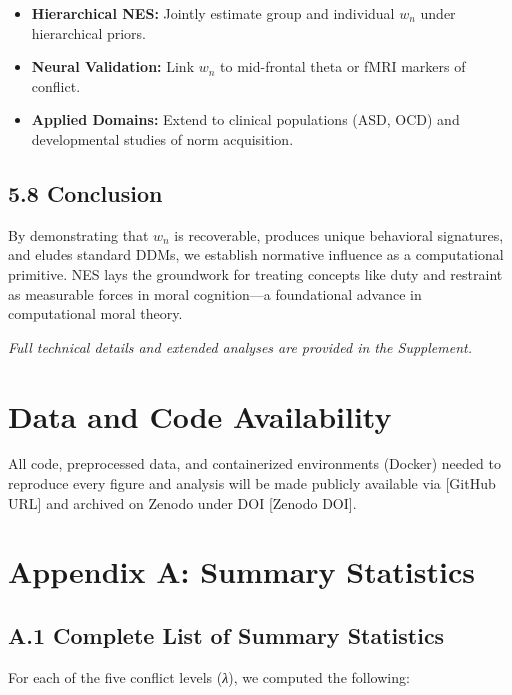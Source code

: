 \documentclass[
  11pt,
]{article}
\providecommand{\tightlist}{%
  \setlength{\itemsep}{0pt}\setlength{\parskip}{0pt}}
\begin{document}
\begin{itemize}
\tightlist
\item
  \textbf{Hierarchical NES:} Jointly estimate group and individual
  \(w_n\) under hierarchical priors.\\
\item
  \textbf{Neural Validation:} Link \(w_n\) to mid-frontal theta or fMRI
  markers of conflict.\\
\item
  \textbf{Applied Domains:} Extend to clinical populations (ASD, OCD)
  and developmental studies of norm acquisition.
\end{itemize}

\subsection{5.8 Conclusion}\label{conclusion}

By demonstrating that \(w_n\) is recoverable, produces unique behavioral
signatures, and eludes standard DDMs, we establish normative influence
as a computational primitive. NES lays the groundwork for treating
concepts like duty and restraint as measurable forces in moral
cognition---a foundational advance in computational moral theory.

\emph{Full technical details and extended analyses are provided in the
Supplement.}

\section{Data and Code Availability}\label{data-and-code-availability}

All code, preprocessed data, and containerized environments (Docker)
needed to reproduce every figure and analysis will be made publicly
available via {[}GitHub URL{]} and archived on Zenodo under DOI
{[}Zenodo DOI{]}.

\section{Appendix A: Summary
Statistics}\label{appendix-a-summary-statistics}

\subsection{A.1 Complete List of Summary
Statistics}\label{a.1-complete-list-of-summary-statistics}

For each of the five conflict levels (\emph{λ}), we computed the
following:
\end{document}
